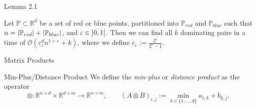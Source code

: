 \begin{frame}{Lemma 2.1\autocite{Chan2007}}
    \begin{lemma}\label{lem:dom_pairs}
        Let $\mathbb{P} \subset \mathbb{R}^d$ be a set of red or blue points, partitioned into $\mathbb{P}_{red}$ and $\mathbb{P}_{blue}$ such that $n = \left\lvert\mathbb{P}_{red}\right\rvert_{} + \left\lvert\mathbb{P}_{blue}\right\rvert_{}$, and $\varepsilon \in \interval[open]{0}{1}$.
        Then we can find all $k$ dominating pairs in a time of $\mathcal{O}\left( c_\varepsilon^d n^{1 + \varepsilon} + k \right)$, where we define $c_\varepsilon := \frac{2^\varepsilon}{2^\varepsilon - 1}$.
    \end{lemma}
\end{frame}

\begin{frame}{Matrix Products}
    \begin{alertblock}{Min-Plus/Distance Product}
        We define the \emph{min-plus} or \emph{distance product} as the operator
        \[
            \otimes : \mathbb{R}^{n \times d} \times \mathbb{R}^{d \times m} \rightarrow \mathbb{R}^{n \times m},\qquad
            {\left( A \otimes B \right)}_{i, j} := \min\limits_{k \in \{ 1, \dots, d \}} a_{i, k} + b_{k, j}.
        \]
    \end{alertblock}

\end{frame}
